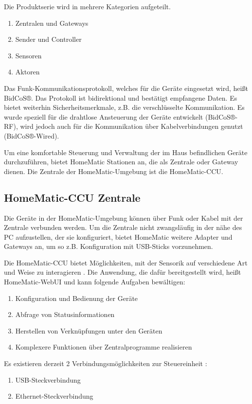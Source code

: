 Die Produktserie wird in mehrere Kategorien aufgeteilt.
\begin{enumerate}
\item{Zentralen und Gateways}
\item{Sender und Controller}
\item{Sensoren}
\item{Aktoren}
\end{enumerate}

Das Funk-Kommunikationsprotokoll, welches für die Geräte eingesetzt wird, heißt BidCoS®.
Das Protokoll ist bidirektional und bestätigt empfangene Daten.
Es bietet weiterhin Sicherheitsmerkmale, z.B. die verschlüsselte Kommunikation.
Es wurde speziell für die drahtlose Ansteuerung der Geräte entwickelt \cite{homematic_eq3_faq} (BidCoS®-RF),
wird jedoch auch für die Kommunikation über Kabelverbindungen genutzt (BidCoS®-Wired).

Um eine komfortable Steuerung und Verwaltung der im Haus befindlichen Geräte durchzuführen,
bietet HomeMatic Stationen an, die als Zentrale oder Gateway dienen.
Die Zentrale der HomeMatic-Umgebung ist die HomeMatic-CCU.

\subsection{HomeMatic-CCU Zentrale}
\label{gru_hm_ccu}

Die Geräte in der HomeMatic-Umgebung können über Funk oder Kabel mit der Zentrale verbunden
werden.
Um die Zentrale nicht zwangsläufig in der nähe des PC aufzustellen, der sie konfiguriert,
bietet HomeMatic weitere Adapter und Gateways an, um so z.B. Konfiguration mit USB-Sticks vorzunehmen.

Die HomeMatic-CCU bietet Möglichkeiten, mit der Sensorik auf verschiedene Art und Weise zu
interagieren \cite[Seite 6]{homematic_ccu}.
Die Anwendung, die dafür bereitgestellt wird, heißt HomeMatic-WebUI \cite{homematic_webui_manual}
und kann folgende Aufgaben bewältigen:
\begin{enumerate}
\item Konfiguration und Bedienung der Geräte
\item Abfrage von Statusinformationen
\item Herstellen von Verknüpfungen unter den Geräten
\item Komplexere Funktionen über Zentralprogramme realisieren
\end{enumerate}

Es existieren derzeit 2 Verbindungsmöglichkeiten zur Steuereinheit \cite[Seite 10]{homematic_ccu}:
\begin{enumerate}
\item USB-Steckverbindung
\item Ethernet-Steckverbindung
\end{enumerate}

